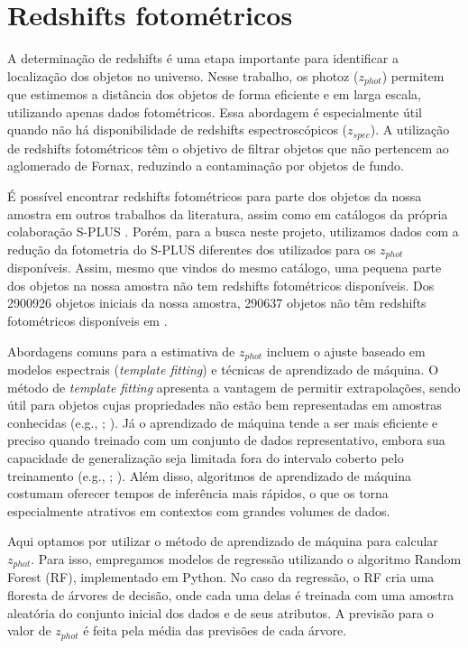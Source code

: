 \section{Redshifts fotométricos}\label{sec:zphot}

A determinação de redshifts é uma etapa importante para identificar a localização dos objetos no universo. Nesse trabalho, os \ac{photoz} (\textit{$z_{phot}$}) permitem que estimemos a distância dos objetos de forma eficiente e em larga escala, utilizando apenas dados fotométricos. Essa abordagem é especialmente útil quando não há disponibilidade de redshifts espectroscópicos (\textit{$z_{spec}$}). A utilização de redshifts fotométricos têm o objetivo de filtrar objetos que não pertencem ao aglomerado de Fornax, reduzindo a contaminação por objetos de fundo.

É possível encontrar redshifts fotométricos para parte dos objetos da nossa amostra em outros trabalhos da literatura, assim como em catálogos da própria colaboração S-PLUS \citep{erik_photoz_2024}. Porém, para a busca neste projeto, utilizamos dados com a redução da fotometria do S-PLUS diferentes dos utilizados para os \textit{$z_{phot}$} disponíveis. Assim, mesmo que vindos do mesmo catálogo, uma pequena parte dos objetos na nossa amostra não tem redshifts fotométricos disponíveis. Dos 2900926 objetos iniciais da nossa amostra, 290637 objetos não têm redshifts fotométricos disponíveis em \citep{erik_photoz_2024}.

Abordagens comuns para a estimativa de \textit{$z_{phot}$} incluem o ajuste baseado em modelos espectrais (\textit{template fitting}) e técnicas de aprendizado de máquina. O método de \textit{template fitting} apresenta a vantagem de permitir extrapolações, sendo útil para objetos cujas propriedades não estão bem representadas em amostras conhecidas (e.g., \citealt{Bolzonella_2000}; \citealt{Gorecki_2014}). Já o aprendizado de máquina tende a ser mais eficiente e preciso quando treinado com um conjunto de dados representativo, embora sua capacidade de generalização seja limitada fora do intervalo coberto pelo treinamento (e.g., \citealt{Carrasco_2013}; \citealt{Sadeh_2016}). Além disso, algoritmos de aprendizado de máquina costumam oferecer tempos de inferência mais rápidos, o que os torna especialmente atrativos em contextos com grandes volumes de dados.


Aqui optamos por utilizar o método de aprendizado de máquina para calcular \textit{$z_{phot}$}. Para isso, empregamos modelos de regressão utilizando o algoritmo Random Forest (RF), implementado em Python. No caso da regressão, o RF cria uma floresta de árvores de decisão, onde cada uma delas é treinada com uma amostra aleatória do conjunto inicial dos dados e de seus atributos. A previsão para o valor de \textit{$z_{phot}$} é feita pela média das previsões de cada árvore.

